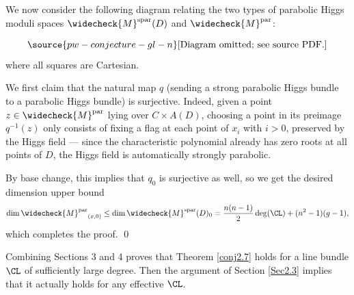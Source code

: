 We now consider the following diagram relating the two types of parabolic Higgs moduli spaces $\widecheck{M}^{\mathrm{spar}}(D)$ and
$\widecheck{M}^{\mathrm{par}}$:

\begin{equation}\label{diagram}
\source{pw-conjecture-gl-n}
\text{[Diagram omitted; see source PDF.]}
\end{equation}
where all squares are Cartesian.

We first claim that the natural map $q$ (sending a strong parabolic Higgs bundle to a parabolic Higgs bundle) is surjective. Indeed, given a point $z \in \widecheck{M}^{\mathrm{par}}$ lying over $C\times {A}(D)$,
choosing a point in its preimage $q^{-1}(z)$ only consists of fixing a flag at each point of $x_i$ with $i>0$, preserved by the Higgs field --- since the characteristic polynomial already has zero roots at all points of $D$, the Higgs field is automatically strongly parabolic.


By base change, this implies that $q_0$ is surjective as well, so we get the desired dimension upper bound
\[
\dim {\widecheck{M}^{\mathrm{par}}}_{(x,0)} \leq \dim \widecheck{M}^{\mathrm{spar}}(D)_0 = \frac{n(n-1)}{2}\deg (\CL) + (n^2-1)(g-1),
\]
which completes the proof. \qed


\begin{rmk}
\notready
Combining Sections 3 and 4 proves that Theorem \ref{conj2.7} holds for a line bundle $\CL$ of sufficiently large degree. Then the argument of Section \ref{Sec2.3} implies that it actually holds for any effective $\CL$.
\end{rmk}








